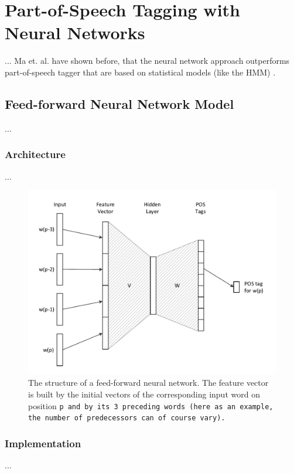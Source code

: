 \chapter{Part-of-Speech Tagging with Neural Networks}\label{c.postagging}
...
Ma et. al. have shown before, that the neural network approach outperforms part-of-speech tagger that are based on statistical models (like the HMM) \cite{ma2000}.

\section{Feed-forward Neural Network Model}\label{c.postagging.fnn}
...

\subsection{Architecture}\label{c.postagging.fnn.architecture}
...

\begin{figure}[H]
	\includegraphics[width=\textwidth]{images/fnn_structure}
	\caption[Structure of a Feed-forward Neural Network]{The structure of a feed-forward neural network. The feature vector is built by the initial vectors of the corresponding input word on position \tt{p} and by its \tt{3} preceding words (here as an example, the number of predecessors can of course vary).}
	\label{f.fnn_structure}
\end{figure}

\subsection{Implementation}\label{c.postagging.fnn.implementation}
...

